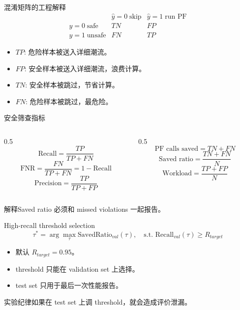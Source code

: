 \documentclass[aspectratio=169,11pt]{beamer}
\begin{document}
\begin{frame}{混淆矩阵的工程解释}
\centering
\[\begin{array}{c|cc}& \hat y=0\;\text{skip} & \hat y=1\;\text{run PF} \\\hline y=0\;\text{safe} & TN & FP \\ y=1\;\text{unsafe} & FN & TP\end{array}\]
\begin{itemize}\item $TP$: 危险样本被送入详细潮流。\item $FP$: 安全样本被送入详细潮流，浪费计算。\item $TN$: 安全样本被跳过，节省计算。\item $FN$: 危险样本被跳过，最危险。\end{itemize}
\end{frame}

\begin{frame}{安全筛查指标}
\begin{columns}
\begin{column}{0.5\textwidth}\[\text{Recall}=\frac{TP}{TP+FN}\]\[\text{FNR}=\frac{FN}{TP+FN}=1-\text{Recall}\]\[\text{Precision}=\frac{TP}{TP+FP}\]\end{column}
\begin{column}{0.5\textwidth}\[\text{PF calls saved}=TN+FN\]\[\text{Saved ratio}=\frac{TN+FN}{N}\]\[\text{Workload}=\frac{TP+FP}{N}\]\end{column}
\end{columns}
\begin{alertblock}{解释}Saved ratio 必须和 missed violations 一起报告。\end{alertblock}
\end{frame}

\begin{frame}{High-recall threshold selection}
\[\tau^* = \arg\max_\tau \text{SavedRatio}_{val}(\tau),\quad \text{s.t. }\text{Recall}_{val}(\tau)\ge R_{target}\]
\begin{itemize}\item 默认 $R_{target}=0.95$。\item threshold 只能在 validation set 上选择。\item test set 只用于最后一次性能报告。\end{itemize}
\begin{alertblock}{实验纪律}如果在 test set 上调 threshold，就会造成评价泄漏。\end{alertblock}
\end{frame}
\end{document}
